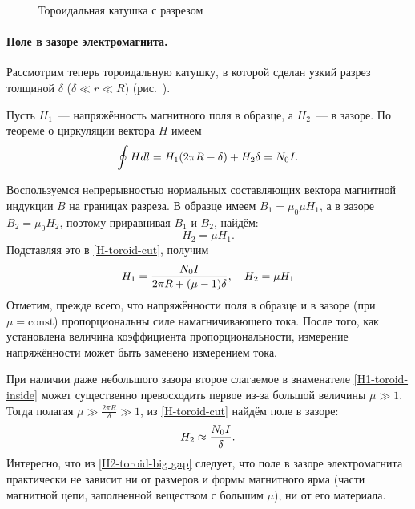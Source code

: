 \begin{wrapfigure}{o}{0.4\textwidth}
    \caption{Тороидальная катушка с разрезом}
\end{wrapfigure}

\paragraph{Поле в зазоре электромагнита.}
Рассмотрим теперь тороидальную катушку, в которой сделан узкий разрез толщиной
$\delta$ ($\delta \ll r \ll R$) (рис.~).

Пусть $H_1$~--- напряжённость магнитного поля в
образце, а $H_2$~--- в зазоре. По теореме о циркуляции вектора $H$ имеем
\begin{equation}
	\eqmark{H-toroid-cut}
	\oint {Hdl} = H_1 (2\pi R - \delta) + H_2 \delta  = N_0 I.
\end{equation}

Воспользуемся нeпрерывностью нормальных составляющих вектора магнитной
индукции $B$ на границах разреза. В образце имеем $B_1 = \mu_0 \mu H_1$,
а в зазоре $B_2 = \mu_0 H_2$, поэтому приравнивая $B_1$ и $B_2$, найдём:
\begin{equation*}H_2 = \mu H_1.\end{equation*}
Подставляя это в \eqref{H-toroid-cut}, получим
\begin{equation}
	\eqmark{H1-toroid-inside}
	H_1 = \frac{N_0 I}{2\pi R + (\mu - 1)\delta},\quad H_2 = \mu H_1
\end{equation}
Отметим, прежде всего, что напряжённости поля в образце и в зазоре
(при $\mu = \mathrm{const}$) пропорциональны силе намагничивающего тока.
После того, как установлена величина коэффициента
пропорциональности, измерение напряжённости может быть заменено измерением тока.

При наличии даже небольшого зазора второе слагаемое в знаменателе
\eqref{H1-toroid-inside} может существенно превосходить первое из-за большой величины
$\mu\gg1$. Тогда полагая $\mu\gg \frac{2\pi R}{\delta}\gg 1$, из
\eqref{H-toroid-cut} найдём поле в зазоре:
\begin{equation}
	\eqmark{H2-toroid-big gap}
	H_2 \approx \frac{N_0 I}{\delta}.
\end{equation}
Интересно, что из \eqref{H2-toroid-big gap} следует, что поле в зазоре
электромагнита практически не зависит ни от размеров и формы магнитного ярма (части
магнитной цепи, заполненной веществом с большим $\mu$), ни от его материала.

